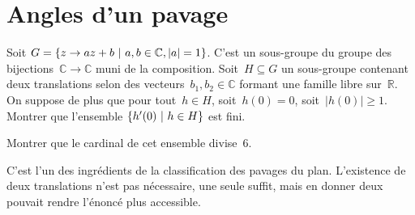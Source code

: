 \section{Angles d'un pavage}

Soit $G = \left\{ z\to az+b \ \middle|\  a, b \in \mathbb{C}, |a| = 1 \right\}$. C'est un sous-groupe du groupe des bijections~$\mathbb{C}\to\mathbb{C}$ muni de la composition.
Soit~$H \subseteq G$ un sous-groupe contenant deux translations selon des vecteurs~$b_1,b_2 \in \mathbb{C}$ formant une famille libre sur~$\mathbb{R}$.
On suppose de plus que pour tout~$h \in H$, soit~$h(0) = 0$, soit~$|h(0)| \geq 1$.
Montrer que l'ensemble $\left\{ h'(0) \ \middle|\  h\in H \right\}$ est fini.

Montrer que le cardinal de cet ensemble divise~6.

\begin{em}
  C'est l'un des ingrédients de la classification des pavages du plan.
  L'existence de deux translations n'est pas nécessaire, une seule suffit, mais en donner deux pouvait rendre l'énoncé plus accessible.
\end{em}

